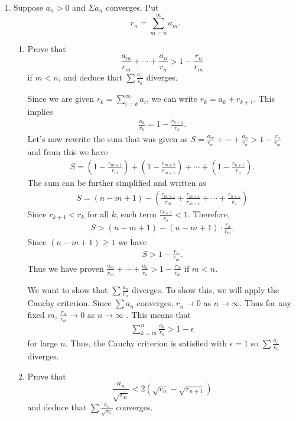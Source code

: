 \documentclass [10pt]{article}
\newcommand{\jg}[1]{{\color{blue} #1}}
\begin{document}
\begin{enumerate}
\clearpage
\item Suppose $a_n>0$ and $\Sigma a_n$ converges. Put
$$
r_n=\sum_{m=n}^{\infty} a_m .
$$
\begin{enumerate}
\item Prove that
$$
\frac{a_m}{r_m}+\cdots+\frac{a_n}{r_n}>1-\frac{r_n}{r_m} $$
if $m<n$, and deduce that $\sum \frac{a_n}{r_n}$ diverges.

\jg{
Since we are given $r_k = \sum_{i=k}^\infty a_i$, we can write $r_k = a_k + r_{k+1}$. This implies 
\begin{align*}
    \frac{a_k}{r_k} = 1 - \frac{r_{k+1}}{r_k}. 
\end{align*}
Let's now rewrite the sum that was given as $S = \frac{a_m}{r_m}+\cdots+\frac{a_n}{r_n}>1-\frac{r_n}{r_m}$ and from this we have
\begin{align*}
    S = \left( 1 - \frac{r_{m+1}}{r_m}\right) + \left( 1 - \frac{r_{m+2}}{r_{m+1}}\right) + \cdots + \left( 1 - \frac{r_{n+1}}{r_n} \right). 
\end{align*}
The sum can be further simplified and written as 
\begin{align*}
    S = (n - m + 1) - \left(\frac{r_{m+1}}{r_m} + \frac{r_{m+1}}{r_{m+1}} + \cdots + \frac{r_{n+1}}{r_n}\right)
\end{align*}
Since $r_{k+1} < r_k$ for all $k$, each term $\frac{r_{k+1}}{r_k} < 1$. Therefore,
\begin{align*}
    S > (n - m + 1) - (n - m + 1) \cdot \frac{r_n}{r_m}. 
\end{align*}
Since $(n-m+1) \geq 1$ we have 
\begin{align*}
    S > 1 - \frac{r_n}{r_m}. 
\end{align*}
Thus we have proven $\frac{a_m}{r_m}+\cdots+\frac{a_n}{r_n}>1-\frac{r_n}{r_m} $ if $m < n$. 

We want to show that $\sum \frac{a_n}{r_n}$ diverges. To show this, we will apply the Cauchy criterion. Since $\sum a_n$ converges, $r_n \rightarrow 0$ as $n \rightarrow \infty$. Thus for any fixed $m$, $\frac{r_n}{r_m} \rightarrow 0$ as $n \rightarrow \infty$ . This means that
\begin{align*}
    \sum_{k=m}^n \frac{a_k}{r_k} > 1 - \epsilon
\end{align*}
for large $n$. Thus, the Cauchy criterion is satisfied with $\epsilon = 1$ so $\sum \frac{a_n}{r_n}$ diverges. 

}

\item Prove that
$$
\frac{a_n}{\sqrt{r_n}}<2\left(\sqrt{r_n}-\sqrt{r_{n+1}}\right)
$$
and deduce that $\sum \frac{a_n}{\sqrt{r_n}}$ converges.



\end{enumerate}
\end{enumerate}
\end{document}
